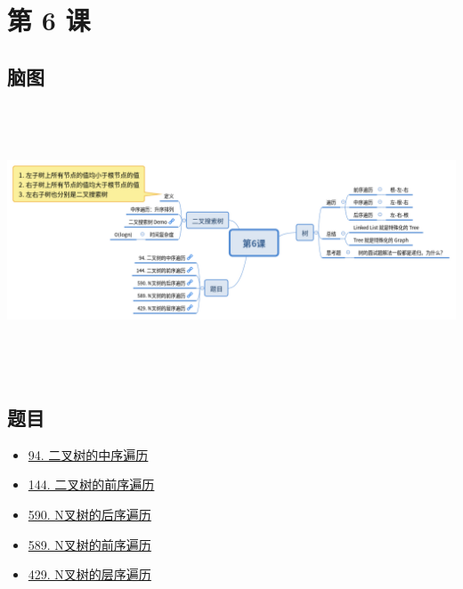 \newpage
\section{第 6 课}

\subsection{脑图}

\includegraphics[width=170mm,height=80mm]{images/第6课.png}

\subsection{题目}

\begin{itemize}
  \item \hyperref[leetcode:94]{94. 二叉树的中序遍历}
  \item \hyperref[leetcode:144]{144. 二叉树的前序遍历}
  \item \hyperref[leetcode:590]{590. N叉树的后序遍历}
  \item \hyperref[leetcode:589]{589. N叉树的前序遍历}
  \item \hyperref[leetcode:429]{429. N叉树的层序遍历}
\end{itemize}
